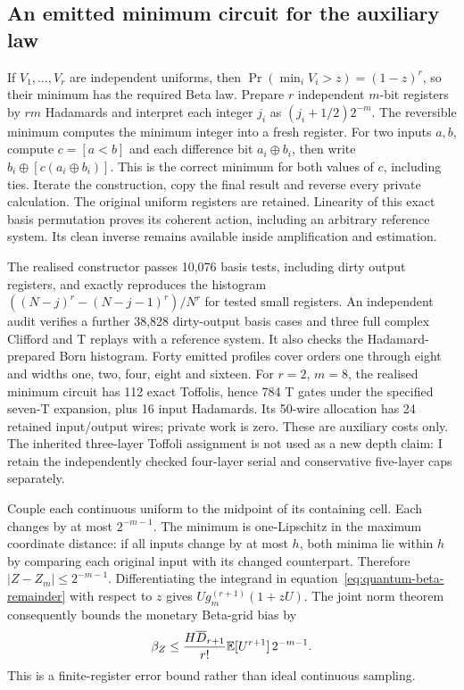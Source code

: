 \subsection{An emitted minimum circuit for the auxiliary law}

If $V_1,\ldots,V_r$ are independent uniforms, then
$\Pr(\min_i V_i>z)=(1-z)^r$, so their minimum has the required Beta law.
Prepare $r$ independent $m$-bit registers by $rm$ Hadamards and interpret
each integer $j_i$ as $(j_i+1/2)2^{-m}$. The reversible minimum computes
the minimum integer into a fresh register. For two inputs $a,b$, compute
$c=[a<b]$ and each difference bit $a_i\mathbin\oplus b_i$, then write
$b_i\mathbin\oplus[c(a_i\mathbin\oplus b_i)]$. This is the correct
minimum for both values of $c$, including ties. Iterate the construction,
copy the final result and reverse every private calculation. The original
uniform registers are retained. Linearity of this exact basis permutation
proves its coherent action, including an arbitrary reference system.
Its clean inverse remains available inside amplification and estimation.

The realised constructor passes 10,076 basis tests, including dirty output
registers, and exactly reproduces the histogram
$((N-j)^r-(N-j-1)^r)/N^r$ for tested small registers. An independent audit verifies a further 38,828 dirty-output basis cases
and three full complex Clifford and T replays with a reference system.
It also checks the Hadamard-prepared Born histogram. Forty emitted profiles
cover orders one through eight and widths one, two, four, eight and sixteen.
For $r=2$, $m=8$, the realised minimum circuit has 112 exact Toffolis,
hence 784 T gates under the specified seven-T expansion, plus 16 input
Hadamards. Its 50-wire allocation has 24 retained input/output wires;
private work is zero. These are auxiliary costs only. The inherited
three-layer Toffoli assignment is not used as a new depth claim: I retain
the independently checked four-layer serial and conservative five-layer
caps separately.

Couple each continuous uniform to the midpoint of its containing cell.
Each changes by at most $2^{-m-1}$. The minimum is one-Lipschitz in the
maximum coordinate distance: if all inputs change by at most $h$, both
minima lie within $h$ by comparing each original input with its changed
counterpart. Therefore $|Z-Z_m|\leq2^{-m-1}$. Differentiating the integrand
in equation~\eqref{eq:quantum-beta-remainder} with respect to $z$ gives
$U g_m^{(r+1)}(1+zU)$. The joint norm theorem consequently bounds the
monetary Beta-grid bias by
\begin{equation}
 \beta_Z\leq {H\overline D_{r+1}\over r!}
           \mathbb E[U^{r+1}]\,2^{-m-1}.
 \label{eq:quantum-beta-grid-bias}
\end{equation}
This is a finite-register error bound rather than ideal continuous sampling.

